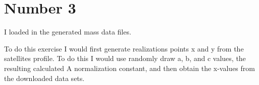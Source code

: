 \section{Number 3}

I loaded in the generated mass data files.

To do this exercise I would first generate realizations points x and y from the satellites profile. To do this I would use randomly draw a, b, and c values, the resulting calculated A normalization constant, and then obtain the x-values from the downloaded data sets.





